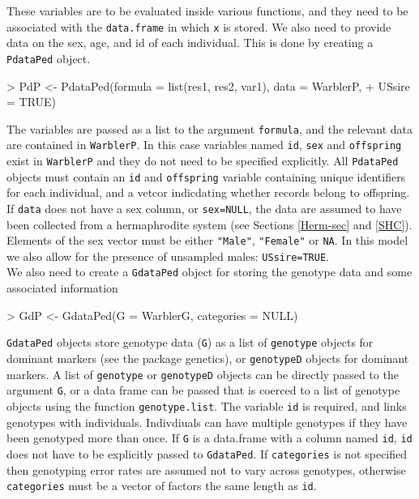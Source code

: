 \documentclass{article}
\begin{document}
 These variables are to be evaluated inside various functions, and they need to be associated with the \texttt{data.frame} in which \texttt{x} is stored. We also need to provide data on the sex, age, and id of each individual.  This is done by creating a \texttt{PdataPed} object.

\begin{Schunk}
\begin{Sinput}
> PdP <- PdataPed(formula = list(res1, res2, var1), data = WarblerP, 
+     USsire = TRUE)
\end{Sinput}
\end{Schunk}

The variables are passed as a list to the argument \texttt{formula}, and the relevant data are contained in \texttt{WarblerP}.  In this case variables named \texttt{id}, \texttt{sex} and \texttt{offspring} exist in \texttt{WarblerP} and they do not need to be specified explicitly.  All \texttt{PdataPed} objects must contain an \texttt{id} and \texttt{offspring} variable containing unique identifiers for each individual, and a vetcor indicdating whether records belong to offspring. If \texttt{data} does not have a sex column, or \texttt{sex=NULL}, the data are assumed to have been collected from a hermaphrodite system (see Sections \ref{Herm-sec} and \ref{SHC}). Elements of the sex vector must be either \texttt{"Male"}, \texttt{"Female"} or \texttt{NA}.  In this model we also allow for the presence of unsampled males: \texttt{USsire=TRUE}.\\

We also need to create a \texttt{GdataPed} object for storing the genotype data and some associated information

\begin{Schunk}
\begin{Sinput}
> GdP <- GdataPed(G = WarblerG, categories = NULL)
\end{Sinput}
\end{Schunk}

\texttt{GdataPed} objects store genotype data (\texttt{G}) as a list of \texttt{genotype} objects for dominant markers (see the package genetics), or \texttt{genotypeD} objects for dominant markers.  A list of \texttt{genotype} or \texttt{genotypeD} objects can be directly passed to the argument \texttt{G}, or a data frame can be passed that is coerced to a list of genotype objects using the function \texttt{genotype.list}. The variable \texttt{id} is required, and links genotypes with individuals.  Indivdiuals can have multiple genotypes if they have been genotyped more than once.  If \texttt{G} is a data.frame with a column named \texttt{id}, \texttt{id} does not have to be explicitly passed to \texttt{GdataPed}.  If \texttt{categories} is not specified then genotyping error rates are assumed not to vary across genotypes, otherwise \texttt{categories} must be a vector of factors the same length as \texttt{id}.\\
\end{document}
